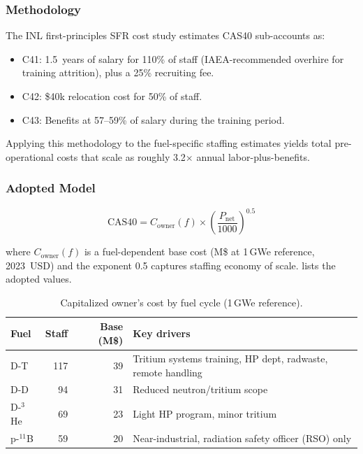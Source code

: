 \documentclass{article}
\begin{document}
\subsubsection{Methodology}
The INL first-principles SFR cost study \citep{prosser2024}
estimates CAS40 sub-accounts as:
\begin{itemize}
\item C41: 1.5~years of salary for 110\% of staff (IAEA-recommended
  overhire for training attrition), plus a 25\% recruiting fee.
\item C42: \$40k relocation cost for 50\% of staff.
\item C43: Benefits at 57--59\% of salary during the training period.
\end{itemize}
Applying this methodology to the fuel-specific staffing estimates
yields total pre-operational costs that scale as roughly 3.2$\times$
annual labor-plus-benefits.

\subsubsection{Adopted Model}
\begin{equation}
\label{eq:cas40}
\text{CAS40} = C_{\text{owner}}(f) \times
               \left(\frac{P_{\text{net}}}{1000}\right)^{0.5}
\end{equation}

\noindent where $C_{\text{owner}}(f)$ is a fuel-dependent base cost
(M\$ at 1\,GWe reference, 2023~USD) and the exponent 0.5 captures
staffing economy of scale.  lists the adopted
values.

\begin{table}[htbp]
\caption{Capitalized owner's cost by fuel cycle (1\,GWe reference).}
\label{tab:cas40-fuel}
\centering
\begin{tabular}{lrrl}
\toprule
Fuel & Staff & Base (M\$) & Key drivers \\
\midrule
D-T          & 117 & 39 & Tritium systems training, HP dept, radwaste, remote handling \\
D-D          &  94 & 31 & Reduced neutron/tritium scope \\
D-${}^3$He   &  69 & 23 & Light HP program, minor tritium \\
p-${}^{11}$B &  59 & 20 & Near-industrial, radiation safety officer (RSO) only \\
\bottomrule
\end{tabular}
\end{table}
\end{document}
